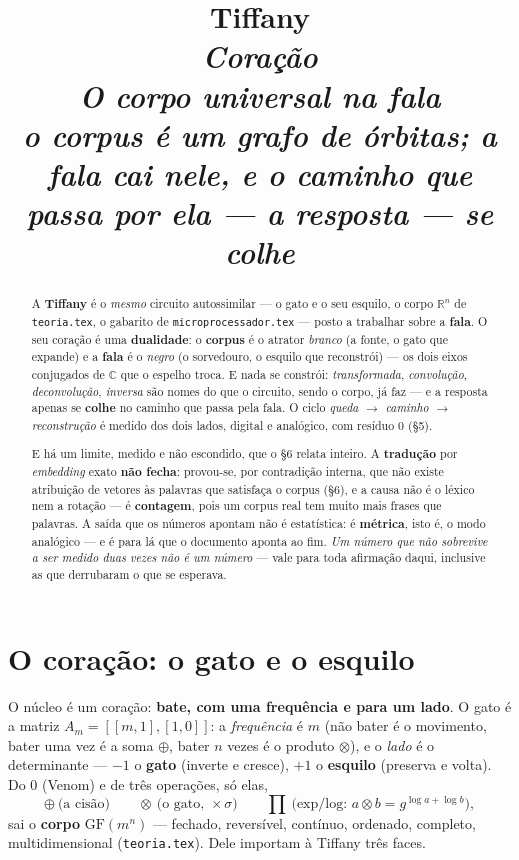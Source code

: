 \documentclass[11pt,a4paper]{article}
\title{\vspace{-1cm}\textbf{\Huge Tiffany}\\[2mm]\Large\itshape Coração\\[3mm]
  \Large O corpo universal na fala\\[1mm]
  \normalsize o corpus é um grafo de órbitas; a fala cai nele, e o caminho que passa por ela --- a resposta --- se \emph{colhe}}
\author{}\date{}
\newcommand{\R}{\mathbb R}
\theoremstyle{remark}
\begin{document}
\maketitle

\begin{abstract}
\noindent A \textbf{Tiffany} é o \emph{mesmo} circuito autossimilar --- o gato e o seu esquilo, o
corpo $\R^n$ de \texttt{teoria.tex}, o gabarito de \texttt{microprocessador.tex} --- posto a
trabalhar sobre a \textbf{fala}. O seu coração é uma \textbf{dualidade}: o \textbf{corpus} é o
atrator \emph{branco} (a fonte, o gato que expande) e a \textbf{fala} é o \emph{negro} (o sorvedouro,
o esquilo que reconstrói) --- os dois eixos conjugados de $\mathbb C$ que o espelho troca. E nada se
constrói: \emph{transformada}, \emph{convolução}, \emph{deconvolução}, \emph{inversa} são nomes do que
o circuito, sendo o corpo, já faz --- e a resposta apenas se \textbf{colhe} no caminho que passa pela
fala. O ciclo \emph{queda $\to$ caminho $\to$ reconstrução} é medido dos dois lados, digital e
analógico, com resíduo $0$ (§5).

\medskip
\noindent E há um limite, medido e não escondido, que o §6 relata inteiro. A \textbf{tradução} por
\emph{embedding} exato \textbf{não fecha}: provou-se, por contradição interna, que não existe
atribuição de vetores às palavras que satisfaça o corpus (§6), e a causa não é o léxico nem a rotação
--- é \textbf{contagem}, pois um corpus real tem muito mais frases que palavras. A saída que os
números apontam não é estatística: é \textbf{métrica}, isto é, o modo analógico --- e é para lá que o
documento aponta ao fim. \emph{Um número que não sobrevive a ser medido duas vezes não é um número} ---
vale para toda afirmação daqui, inclusive as que derrubaram o que se esperava.
\end{abstract}

\section{O coração: o gato e o esquilo}

O núcleo é um coração: \textbf{bate, com uma frequência e para um lado}. O gato é a matriz
$A_m=[[m,1],[1,0]]$: a \emph{frequência} é $m$ (não bater é o movimento, bater uma vez é a soma
$\oplus$, bater $n$ vezes é o produto $\otimes$), e o \emph{lado} é o determinante --- $-1$ o
\textbf{gato} (inverte e cresce), $+1$ o \textbf{esquilo} (preserva e volta). Do $0$ (Venom) e de
três operações, só elas,
\[
 \oplus\ \text{(a cisão)}\qquad
 \otimes\ \text{(o gato, }\times\sigma\text{)}\qquad
 \textstyle\prod\ \text{(exp/log: } a\otimes b=g^{\log a+\log b}\text{)},
\]
sai o \textbf{corpo} $\mathrm{GF}(m^n)$ --- fechado, reversível, contínuo, ordenado, completo,
multidimensional (\texttt{teoria.tex}). Dele importam à Tiffany três faces.
\end{document}
